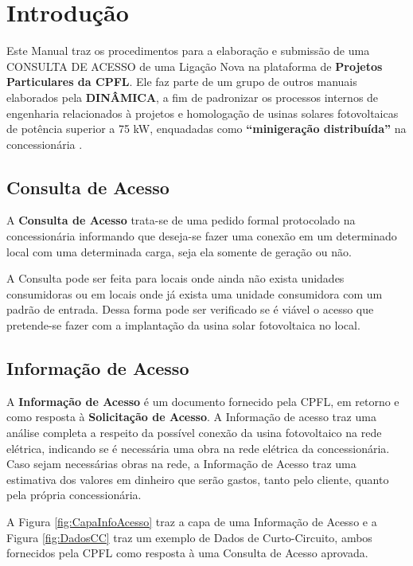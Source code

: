 \chapter{Introdução}


Este Manual traz os procedimentos para a elaboração e submissão de uma CONSULTA DE ACESSO de uma Ligação Nova na plataforma de {\color{blue} \textbf{Projetos Particulares da CPFL}}. Ele faz parte de um grupo de outros manuais elaborados pela {\color{blue} \textbf{DINÂMICA}}, a fim de padronizar os processos internos de engenharia relacionados à projetos e homologação de usinas solares fotovoltaicas de potência superior a 75 kW, enquadadas como \textbf{``minigeração distribuída''} na concessionária {\color{CPFL}}. 

\section{Consulta de Acesso}

A \textbf{Consulta de Acesso} trata-se de uma pedido formal protocolado na concessionária informando que deseja-se fazer uma conexão em um determinado local com uma determinada carga, seja ela somente de geração ou não.

A Consulta pode ser feita para locais onde ainda não exista unidades consumidoras ou em locais onde já exista uma unidade consumidora com um padrão de entrada. Dessa forma pode ser verificado se é viável o acesso que pretende-se fazer com a implantação da usina solar fotovoltaica no local.

\section{Informação de Acesso}

A \textbf{Informação de Acesso} é um documento fornecido pela CPFL, em retorno e como resposta à \textbf{Solicitação de Acesso}. A Informação de acesso traz uma análise completa a respeito da possível conexão da usina fotovoltaico na rede elétrica, indicando se é necessária uma obra na rede elétrica da concessionária. Caso sejam necessárias obras na rede, a Informação de Acesso traz uma estimativa dos valores em dinheiro que serão gastos, tanto pelo cliente, quanto pela própria concessionária.

A Figura \ref{fig:CapaInfoAcesso} traz a capa de uma Informação de Acesso e a Figura \ref{fig:DadosCC} traz um exemplo de Dados de Curto-Circuito, ambos fornecidos pela CPFL como resposta à uma Consulta de Acesso aprovada.


